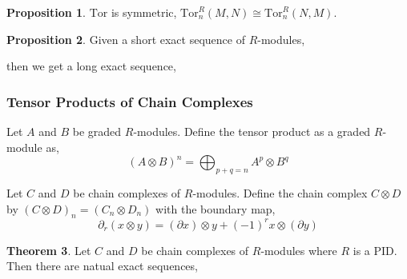 \documentclass[12pt]{extarticle}
\theoremstyle{definition}
\newtheorem{theorem}{Theorem}[section]
\newtheorem{proposition}[theorem]{Proposition}
\newenvironment{definition}[1][Definition:]{\begin{trivlist}
\item[\hskip \labelsep {\bfseries #1}]}{\end{trivlist}}
\newcommand{\Tor}[4]{\mathrm{Tor}^{#1}_{#2} \left( #3, #4 \right)}
\begin{document}
\begin{proposition}
$\mathrm{Tor}$ is symmetric, $\Tor{R}{n}{M}{N} \cong \Tor{R}{n}{N}{M}$.
\end{proposition}

\begin{proposition}
Given a short exact sequence of $R$-modules,
\begin{center}
\end{center}
then we get a long exact sequence,
\begin{center}
\end{center}
\end{proposition}



\subsubsection{Tensor Products of Chain Complexes}

\begin{definition}
Let $A$ and $B$ be graded $R$-modules. Define the tensor product as a graded $R$-module as,
\[ (A \otimes B)^n = \bigoplus_{p+q = n} A^p \otimes B^q \]
\end{definition}

\begin{definition}
Let $C$ and $D$ be chain complexes of $R$-modules. Define the chain complex $C \otimes D$ by $(C \otimes D)_n = (C_n \otimes D_n)$ with the boundary map,
\[ \partial_r (x \otimes y) = (\partial x) \otimes y + (-1)^r x \otimes (\partial y) \] 
\end{definition}

\begin{theorem}
Let $C$ and $D$ be chain complexes of $R$-modules where $R$ is a PID. Then there are natual exact sequences,
\begin{center}
\end{center}
\end{theorem}
\end{document}
